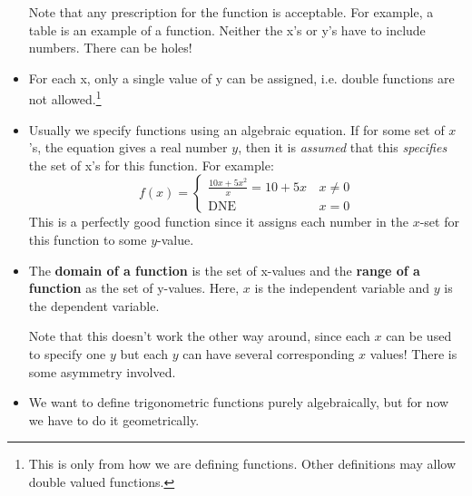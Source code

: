 \begin{itemize}
\begin{definition}
    \end{definition}
    Note that any prescription for the function is acceptable. For example, a table is an example of a function. Neither the x's or y's have to include numbers. There can be holes!
    \item For each x, only a single value of y can be assigned, i.e. double functions are not allowed.\footnote{This is only from how we are defining functions. Other definitions may allow double valued functions.}
    \item Usually we specify functions using an algebraic equation. If for some set of $x$'s, the equation gives a real number $y$, then it is \textit{assumed} that this \textit{specifies} the set of x's for this function. For example:
    \begin{equation}
        f(x)=\begin{cases}
            \frac{10x+5x^2}{x}=10+5x\, & x\neq 0\\ 
            \text{DNE}\, & x = 0
        \end{cases}
        \label{eq:}
    \end{equation}
    This is a perfectly good function since it assigns each number in the $x$-set for this function to some $y$-value.
    \item The \textbf{domain of a function} is the set of x-values and the \textbf{range of a function} as the set of y-values. Here, $x$ is the independent variable and $y$ is the dependent variable.
    
    Note that this doesn't work the other way around, since each $x$ can be used to specify one $y$ but each $y$ can have several corresponding $x$ values! There is some asymmetry involved.
    \item We want to define trigonometric functions purely algebraically, but for now we have to do it geometrically.
    \begin{center}
\end{center}
\end{itemize}
